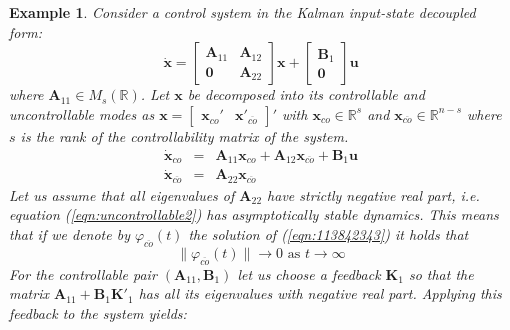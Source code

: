 \documentclass[a4paper,10pt,oneside]{book}
\newtheorem{example}{Example}
\begin{document}
\begin{example}
 Consider a control system in the Kalman input-state decoupled form:
 \begin{equation}
  \dot{\mathbf{x}}=\left[ {\begin{array}{cc}
      \mathbf{A}_{11} & \mathbf{A}_{12} \\ 
      \mathbf{0} & \mathbf{A}_{22}
\end{array} } \right]\mathbf{x}+\left[ {\begin{array}{c}
      \mathbf{B}_{1} \\ 
      \mathbf{0} 
\end{array} } \right]\mathbf{u}
 \end{equation}
where $\mathbf{A}_{11}\in M_{s}(\mathbb{R})$. Let $\mathbf{x}$ be decomposed into its controllable and uncontrollable modes as $\mathbf{x}=\left[ {\begin{array}{cc}\mathbf{x}_{co}' & \mathbf{x}'_{\overline{co}} \end{array} } \right]'$ with $\mathbf{x}_{co}\in\mathbb{R}^s$ and $\mathbf{x}_{\overline{co}}\in\mathbb{R}^{n-s}$ where $s$ is the rank of the controllability matrix of the system.
\begin{eqnarray}
 \dot{\mathbf{x}}_{co}&=&\mathbf{A}_{11}\mathbf{x}_{co}+\mathbf{A}_{12}\mathbf{x}_{\overline{co}}+\mathbf{B}_1\mathbf{u}\label{eqn:113842343}\\
 \dot{\mathbf{x}}_{\overline{co}} &=& \mathbf{A}_{22}\mathbf{x}_{\overline{co}}\label{eqn:uncontrollable2}
\end{eqnarray}
Let us assume that all eigenvalues of $\mathbf{A}_{22}$ have strictly negative real part, i.e. equation (\ref{eqn:uncontrollable2}) has asymptotically stable dynamics. This means that if we denote by $\varphi_{\overline{co}}(t)$ the solution of (\ref{eqn:113842343}) it holds that
$$\|\varphi_{\overline{co}}(t)\|\to 0\text{ as } t\to\infty$$
For the controllable pair $(\mathbf{A}_{11},\mathbf{B}_1)$ let us choose a feedback $\mathbf{K}_{1}$ so that the matrix $\mathbf{A}_{11}+\mathbf{B}_1\mathbf{K}'_1$ has all its eigenvalues with negative real part. Applying this feedback to the system yields:

\end{example}
\end{document}

